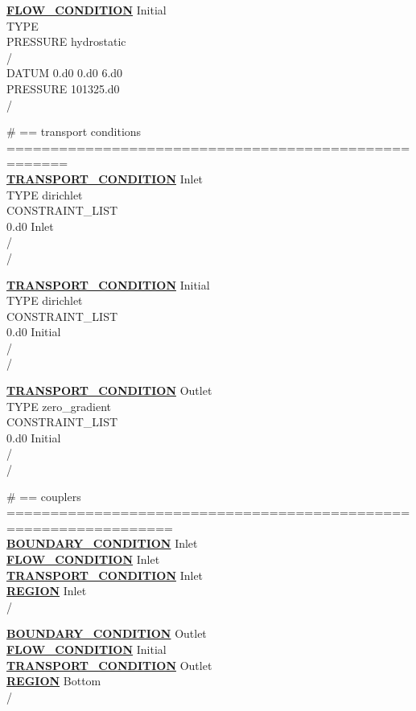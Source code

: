 \noindent
\hyperlink{target_flow_cond}{\bf FLOW\_CONDITION} Initial\\
TYPE\\
PRESSURE hydrostatic\\
/\\
DATUM 0.d0 0.d0 6.d0\\
PRESSURE 101325.d0\\
/

\noindent
\# == transport conditions =====================================================\\
\hyperlink{target_trans_cond}{\bf TRANSPORT\_CONDITION} Inlet\\
TYPE dirichlet\\
CONSTRAINT\_LIST\\
0.d0 Inlet\\
/\\
/

\noindent
\hyperlink{target_trans_cond}{\bf TRANSPORT\_CONDITION} Initial\\
TYPE dirichlet\\
CONSTRAINT\_LIST\\
0.d0 Initial\\
/\\
/

\noindent
\hyperlink{target_trans_cond}{\bf TRANSPORT\_CONDITION} Outlet\\
TYPE zero\_gradient\\
CONSTRAINT\_LIST\\
0.d0 Initial\\
/\\
/

\noindent
\# == couplers =================================================================\\
\hyperlink{target_bcon}{\bf BOUNDARY\_CONDITION} Inlet\\
\hyperlink{target_flow_cond}{\bf FLOW\_CONDITION} Inlet\\
\hyperlink{target_trans_cond}{\bf TRANSPORT\_CONDITION} Inlet\\
\hyperlink{target_region}{\bf REGION} Inlet\\
/

\noindent
\hyperlink{target_bcon}{\bf BOUNDARY\_CONDITION} Outlet\\
\hyperlink{target_flow_cond}{\bf FLOW\_CONDITION} Initial\\
\hyperlink{target_trans_cond}{\bf TRANSPORT\_CONDITION} Outlet\\
\hyperlink{target_region}{\bf REGION} Bottom\\
/

